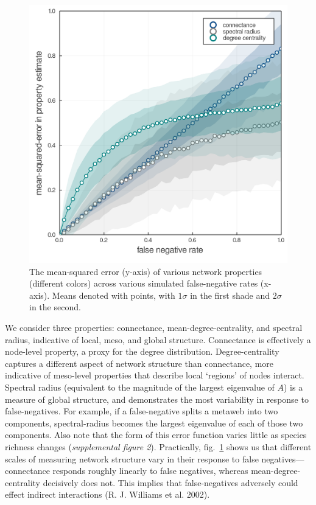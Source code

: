 \documentclass[11pt]{article}
\makeatletter
\def\maxwidth{\ifdim\Gin@nat@width>\linewidth\linewidth
\else\Gin@nat@width\fi}
\let\Oldincludegraphics\includegraphics
\renewcommand{\includegraphics}[1]{\Oldincludegraphics[width=\maxwidth]{#1}}
\makeatother
\begin{document}
\begin{figure}
\hypertarget{fig:properties}{%
\centering
\includegraphics{./figures/props_specrad.png}
\caption{The mean-squared error (y-axis) of various network properties
(different colors) across various simulated false-negative rates
(x-axis). Means denoted with points, with \(1\sigma\) in the first shade
and \(2\sigma\) in the second.}\label{fig:properties}
}
\end{figure}

We consider three properties: connectance, mean-degree-centrality, and
spectral radius, indicative of local, meso, and global structure.
Connectance is effectively a node-level property, a proxy for the degree
distribution. Degree-centrality captures a different aspect of network
structure than connectance, more indicative of meso-level properties
that describe local `regions' of nodes interact. Spectral radius
(equivalent to the magnitude of the largest eigenvalue of \(A\)) is a
measure of global structure, and demonstrates the most variability in
response to false-negatives. For example, if a false-negative splits a
metaweb into two components, spectral-radius becomes the largest
eigenvalue of each of those two components. Also note that the form of
this error function varies little as species richness changes
(\emph{supplemental figure 2}). Practically, fig.~\ref{fig:properties}
shows us that different scales of measuring network structure vary in
their response to false negatives---connectance responds roughly
linearly to false negatives, whereas mean-degree-centrality decisively
does not. This implies that false-negatives adversely could effect
indirect interactions (R. J. Williams et al. 2002).
\end{document}
